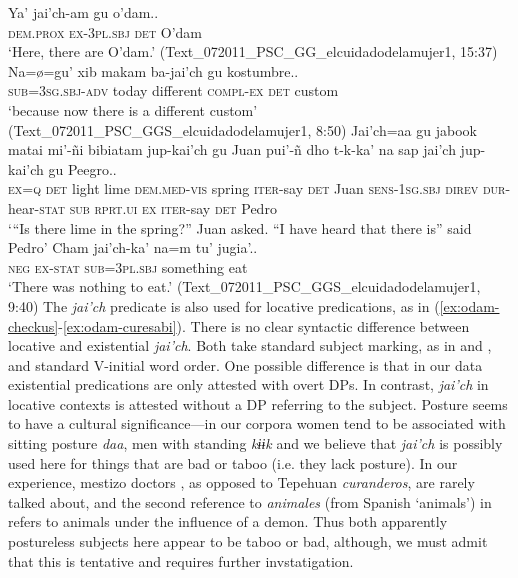 \documentclass[output=paper,draft,draftmode,colorlinks,citecolor=brown]{langscibook}
\begin{document}
\ea
\label{ex:odam-tepehuans}
\gll Ya’ jai’ch-am gu o’dam..\\
\textsc{dem.prox} \textsc{ex-3pl.sbj} \textsc{det} O'dam\\
\glt ‘Here, there are O'dam.’ (Text\_072011\_PSC\_GG\_elcuidadodelamujer1, 15:37)
\z
\ea
\label{ex:odam-custom}
\gll Na=\o=gu’ 	xib 	makam 	ba-jai’ch 	gu 	kostumbre..\\
\textsc{sub=3sg.sbj-adv} today	different	\textsc{compl-ex}	\textsc{det} 	custom\\
\glt ‘because now there is a different custom’ (Text\_072011\_PSC\_GGS\_elcuidadodelamujer1, 8:50)
\z 
\ea
\label{ex:odam-lime}
\gll Jai’ch=aa	gu	jabook	matai	mi’-ñi		bibiatam jup-kai’ch	gu	Juan pui’-ñ			dho		t{\ɇ}-k{\ɇ}{\ɇ}-ka’		na	sap		jai’ch jup-kai’ch	gu	Peegro..\\
\textsc{ex=q}	\textsc{det}	light	lime	\textsc{dem.med-vis}	spring \textsc{iter}-say		\textsc{det}	Juan \textsc{sens-1sg.sbj}	\textsc{direv}	\textsc{dur}-hear-\textsc{stat}	\textsc{sub}	\textsc{rprt.ui}	\textsc{ex} \textsc{iter}-say		\textsc{det}	Pedro\\
\glt ‘“Is there lime in the spring?” Juan asked. “I have heard that there is” said Pedro’ \citep[76]{willettw2015}
\z 
\ea
\label{ex:odam-eat}
\gll Cham 	jai’ch-ka’ 	na=m 			tu’ 		jugia’..\\
\textsc{neg}	\textsc{ex-stat} 	\textsc{sub=3pl.sbj} 	something 	eat\\
\glt ‘There was nothing to eat.’ (Text\_072011\_PSC\_GGS\_elcuidadodelamujer1, 9:40)
\z 
 The \emph{jai'ch} predicate is also used for locative predications, as in (\ref{ex:odam-checkus}-\ref{ex:odam-curesabi}). There is no clear syntactic difference between locative and existential \emph{jai'ch}. Both take standard subject marking, as in  and , and standard V-initial word order. One possible difference is that in our data existential predications are only attested with overt DPs. In contrast, \emph{jai'ch} in locative contexts is attested without a DP referring to the subject. Posture seems to have a cultural significance---in our corpora women tend to be associated with sitting posture \emph{daa}, men with standing \emph{kɨɨk} and we believe that \emph{jai'ch} is possibly used here for things that are bad or taboo (i.e. they lack posture). In our experience, mestizo doctors , as opposed to Tepehuan \emph{curanderos}, are rarely talked about, and the second reference to \emph{animales} (from Spanish `animals') in  refers to animals under the influence of a demon. Thus both apparently postureless subjects here appear to be taboo or bad, although, we must admit that this is tentative and requires further invstatigation. 
\end{document}
